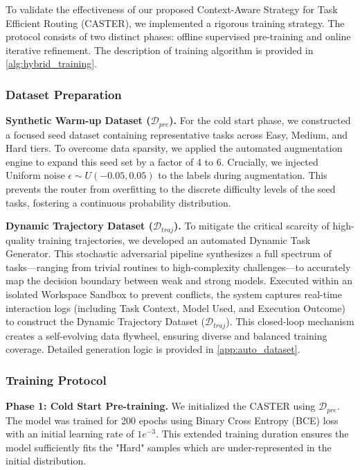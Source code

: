 \documentclass{article}
\theoremstyle{plain}
\theoremstyle{definition}
\theoremstyle{remark}
\begin{document}
To validate the effectiveness of our proposed Context-Aware Strategy for Task Efficient Routing (CASTER), we implemented a rigorous training strategy. The protocol consists of two distinct phases: offline supervised pre-training and online iterative refinement. The description of  training algorithm is provided in \cref{alg:hybrid_training}.

\subsubsection{Dataset Preparation}

\textbf{Synthetic Warm-up Dataset ($\mathcal{D}_{pre}$).} 
For the cold start phase, we constructed a focused seed dataset containing representative tasks across Easy, Medium, and Hard tiers. To overcome data sparsity, we applied the automated augmentation engine to expand this seed set by a factor of 4 to 6. Crucially, we injected Uniform noise $\epsilon \sim U(-0.05, 0.05)$ to the labels during augmentation. This prevents the router from overfitting to the discrete difficulty levels of the seed tasks, fostering a continuous probability distribution.

\textbf{Dynamic Trajectory Dataset ($\mathcal{D}_{traj}$).} 
To mitigate the critical scarcity of high-quality training trajectories, we developed an automated Dynamic Task Generator. This stochastic adversarial pipeline synthesizes a full spectrum of tasks—ranging from trivial routines to high-complexity challenges—to accurately map the decision boundary between weak and strong models. Executed within an isolated Workspace Sandbox to prevent conflicts, the system captures real-time interaction logs (including Task Context, Model Used, and Execution Outcome) to construct the Dynamic Trajectory Dataset ($\mathcal{D}_{traj}$). This closed-loop mechanism creates a self-evolving data flywheel, ensuring diverse and balanced training coverage. Detailed generation logic is provided in \cref{app:auto_dataset}.

\subsubsection{Training Protocol}

\textbf{Phase 1: Cold Start Pre-training.} 
    We initialized the CASTER using $\mathcal{D}_{pre}$. The model was trained for 200 epochs using Binary Cross Entropy (BCE) loss with an initial learning rate of \textbf{$1e^{-3}$}. This extended training duration ensures the model sufficiently fits the "Hard" samples which are under-represented in the initial distribution.
    
\end{document}
